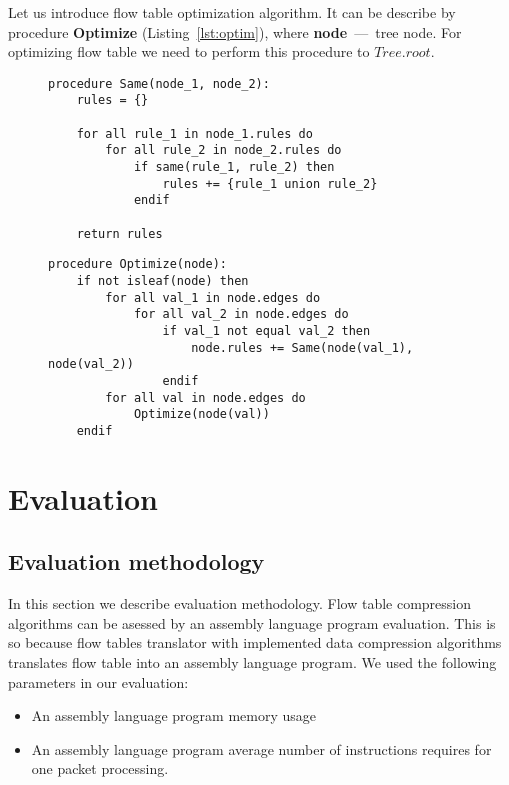 \documentclass[conference]{IEEEtran}
\begin{document}
            Let us introduce flow table optimization algorithm. It can be describe by procedure \textbf{Optimize} (Listing~\ref{lst:optim}), 
            where \textbf{node}~---~tree node. For optimizing flow table we need to perform this procedure to \(Tree.root\).

\begin{figure*}[!t]
\centering
\begin{subfigure}[b]{0.45\textwidth}
\begin{lstlisting}[caption=Procedure for obtaining a set of rules derivedfrom the same rules,label=lst:same]
procedure Same(node_1, node_2):
    rules = {}

    for all rule_1 in node_1.rules do
        for all rule_2 in node_2.rules do
            if same(rule_1, rule_2) then
                rules += {rule_1 union rule_2}
            endif

    return rules
\end{lstlisting}
\end{subfigure}
\hfill
\begin{subfigure}[b]{0.45\textwidth}
\begin{lstlisting}[caption=Procedure for optimizing the tree,label=lst:optim]
procedure Optimize(node):
    if not isleaf(node) then
        for all val_1 in node.edges do
            for all val_2 in node.edges do
                if val_1 not equal val_2 then
                    node.rules += Same(node(val_1), node(val_2))
                endif
        for all val in node.edges do
            Optimize(node(val))
    endif
\end{lstlisting}
\end{subfigure}
\end{figure*}
    \section{Evaluation}
        \subsection{Evaluation methodology}
        In this section we describe evaluation methodology. Flow table compression algorithms can be asessed by an 
        assembly language program evaluation. This is so because flow tables translator with implemented data compression algorithms 
        translates flow table into an assembly language program.
        We used the following parameters in our evaluation:
        \begin{itemize}
            \item An assembly language program memory usage%
            \item An assembly language program average number of instructions requires for one packet processing.%
        \end{itemize}
        
\end{document}
